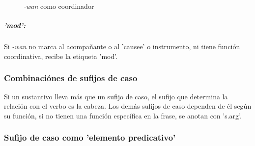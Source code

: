 \documentclass[a4paper,11pt,DIV12]{scrartcl}
\begin{document}
\begin{figure}
 \begin{center}
\end{center}
\caption{{\em -wan} como coordinador}\label{Fig:wanco}
\end{figure}

\subparagraph{'mod':} Si {\em -wan} no marca al acompa\~nante o al 'causee' o instrumento, ni tiene funci\'on coordinativa, recibe la etiqueta 'mod'.


\subsubsection{Combinaci\'ones de sufijos de caso}

Si un sustantivo lleva m\'as que un sufijo de caso, el sufijo que determina la relaci\'on con el verbo es la cabeza. 
Los dem\'as sufijos de caso dependen de \'el seg\'un su funci\'on, si no tienen una funci\'on espec\'ifica en la frase, se anotan con 's.arg'.

\subsubsection{Sufijo de caso como 'elemento predicativo'}
\end{document}
